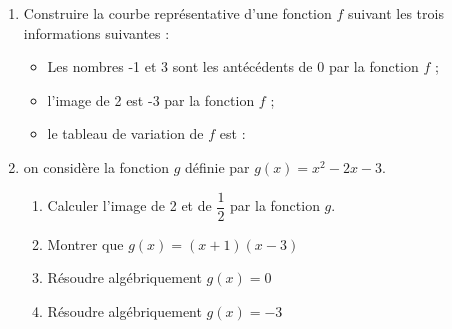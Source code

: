 \exo 

\begin{enumerate}
\item Construire la courbe représentative d'une fonction $f$ suivant les trois informations suivantes :
\begin{itemize}
\item Les nombres -1 et 3 sont les antécédents de 0 par la fonction $f$ ;
\item l'image de 2 est -3 par la fonction $f$ ;
\item le tableau de variation de $f$ est :

\begin{center}
\end{center}
\end{itemize}
\item on considère la fonction $g$ définie par $g(x)= x^2-2x-3$.
\begin{enumerate}
\item Calculer l'image de 2 et de $\dfrac{1}{2}$ par la fonction $g$.
\item Montrer que $g(x)=(x+1)(x-3)$
\item Résoudre algébriquement $g(x)=0$
\item Résoudre algébriquement $g(x)=-3$
\end{enumerate}

\end{enumerate}
